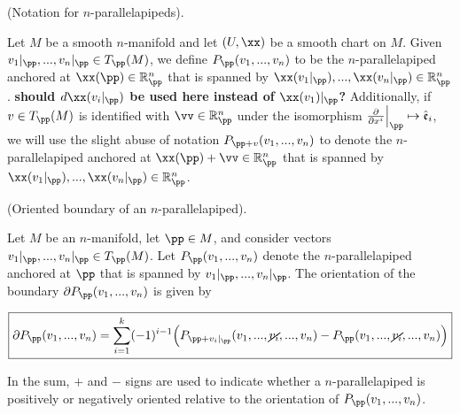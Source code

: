 \begin{defn}
    (Notation for $n$-parallelapipeds).
    
    Let $M$ be a smooth $n$-manifold and let $(U, \xx)$ be a smooth chart on $M$. Given ${v_1|_\pp, ..., v_n|_\pp \in T_\pp(M)}$, we define $P_\pp(v_1, ..., v_n)$ to be the $n$-parallelapiped anchored at $\xx(\pp) \in \R^n_\pp$ that is spanned by ${\xx(v_1|_\pp), ..., \xx(v_n|_\pp) \in \R^n_\pp}$.  \textbf{should $d\xx(v_i|_\pp)$ be used here instead of $\xx(v_1)|_\pp$?} Additionally, if $v \in T_\pp(M)$ is identified with $\vv \in \R^n_\pp$ under the isomorphism ${\frac{\pd}{\pd x^i}\Big|_\pp \mapsto \see_i}$, we will use the slight abuse of notation $P_{\pp + v}(v_1, ..., v_n)$ to denote the $n$-parallelapiped anchored at $\xx(\pp) + \vv \in \R^n_\pp$ that is spanned by $\xx(v_1|_\pp), ..., \xx(v_n|_\pp) \in \R^n_\pp$.
\end{defn}

\begin{theorem}
\label{ch::manifolds::thm::oriented_bdy_parallelapiped}

     (Oriented boundary of an $n$-parallelapiped).
    
    Let $M$ be an $n$-manifold, let $\pp \in M$, and consider vectors $v_1|_\pp, ..., v_n|_\pp \in T_\pp(M)$. Let $P_\pp(v_1, ..., v_n)$ denote the $n$-parallelapiped anchored at $\pp$ that is spanned by $v_1|_\pp, ..., v_n|_\pp$. The orientation of the boundary $\pd P_\pp(v_1, ..., v_n)$ is given by 
    
    \begin{align*}
        \boxed
        {
            \pd P_\pp(v_1, ..., v_n) = \sum_{i = 1}^k (-1)^{i - 1} \Big( P_{\pp + v_i|_\pp}(v_1, ..., \cancel{v_i}, ..., v_n) - P_{\pp}(v_1, ..., \cancel{v_i}, ..., v_n) \Big)
        }
    \end{align*}
    
    In the sum, $+$ and $-$ signs are used to indicate whether a $n$-parallelapiped is positively or negatively oriented relative to the orientation of $P_\pp(v_1, ..., v_n)$.
\end{theorem}

